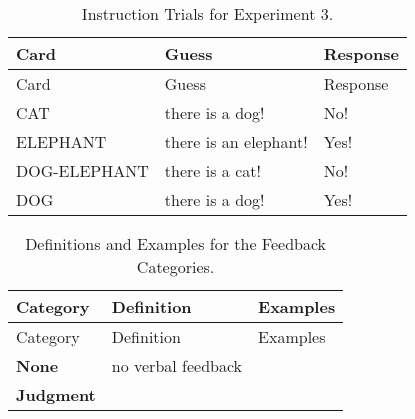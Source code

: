 \documentclass[
  english,
  ,man,floatsintext]{apa6}
\begin{document}
\begin{longtable}[]{@{}lll@{}}
\caption{\label{tab:instructionStudy3} Instruction Trials for Experiment 3.}\tabularnewline
\toprule
Card & Guess & Response\tabularnewline
\midrule
\endfirsthead
\toprule
Card & Guess & Response\tabularnewline
\midrule
\endhead
CAT & there is a dog! & No!\tabularnewline
ELEPHANT & there is an elephant! & Yes!\tabularnewline
DOG-ELEPHANT & there is a cat! & No!\tabularnewline
DOG & there is a dog! & Yes!\tabularnewline
\bottomrule
\end{longtable}

\begin{longtable}[]{@{}lll@{}}
\caption{\label{tab:feedbackCat} Definitions and Examples for the Feedback Categories.}\tabularnewline
\toprule
\begin{minipage}[b]{0.14\columnwidth}\raggedright
Category\strut
\end{minipage} & \begin{minipage}[b]{0.46\columnwidth}\raggedright
Definition\strut
\end{minipage} & \begin{minipage}[b]{0.31\columnwidth}\raggedright
Examples\strut
\end{minipage}\tabularnewline
\midrule
\endfirsthead
\toprule
\begin{minipage}[b]{0.14\columnwidth}\raggedright
Category\strut
\end{minipage} & \begin{minipage}[b]{0.46\columnwidth}\raggedright
Definition\strut
\end{minipage} & \begin{minipage}[b]{0.31\columnwidth}\raggedright
Examples\strut
\end{minipage}\tabularnewline
\midrule
\endhead
\begin{minipage}[t]{0.14\columnwidth}\raggedright
\textbf{None}\strut
\end{minipage} & \begin{minipage}[t]{0.46\columnwidth}\raggedright
no verbal feedback\strut
\end{minipage} & \begin{minipage}[t]{0.31\columnwidth}\raggedright
\strut
\end{minipage}\tabularnewline
\begin{minipage}[t]{0.14\columnwidth}\raggedright
\textbf{Judgment}\strut
\end{minipage} & \begin{minipage}[t]{0.46\columnwidth}\raggedright

\end{minipage}
\end{longtable}
\end{document}
